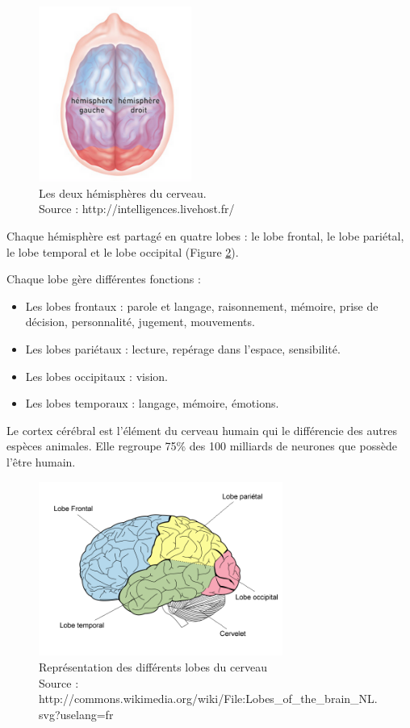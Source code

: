 \begin{figure}[h]
	\centering\includegraphics[width=5cm]{images/brainMap2.png}
	\caption[Les deux hémisphères du cerveau]{Les deux hémisphères du cerveau.\\Source : http://intelligences.livehost.fr/}
	\label{test}
\end{figure}

Chaque hémisphère est partagé en quatre lobes : le lobe frontal, le lobe pariétal, le lobe temporal et le lobe occipital (Figure \ref{fig:brainmap2}).

Chaque lobe gère différentes fonctions :

\begin{itemize}
	\item Les lobes frontaux : parole et langage, raisonnement, mémoire, prise de décision, personnalité, jugement, mouvements.
	\smallbreak
	\item Les lobes pariétaux : lecture, repérage dans l’espace, sensibilité.
	\smallbreak
	\item Les lobes occipitaux : vision.
	\smallbreak
	\item Les lobes temporaux : langage, mémoire, émotions.
\end{itemize}
\smallbreak
Le cortex cérébral est l'élément du cerveau humain qui le différencie des autres espèces animales. Elle regroupe 75\% des 100 milliards de neurones que possède l'être humain. 

\begin{figure}[h]
	\centering\includegraphics[width=8cm]{images/brainMap1.png}
	\caption[Représentation des différents lobes du cerveau]{Représentation des différents lobes du cerveau\\Source : http://commons.wikimedia.org/wiki/File:Lobes\_of\_the\_brain\_NL.svg?uselang=fr }
	\label{fig:brainmap2}
\end{figure}

